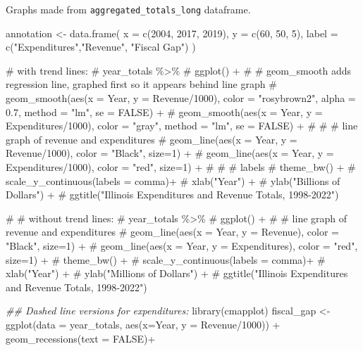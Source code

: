 \documentclass[
  letterpaper,
  DIV=11,
  numbers=noendperiod]{scrreport}
\newenvironment{Shaded}{\begin{snugshade}}{\end{snugshade}}
\newcommand{\AttributeTok}[1]{\textcolor[rgb]{0.40,0.45,0.13}{#1}}
\newcommand{\CommentTok}[1]{\textcolor[rgb]{0.37,0.37,0.37}{#1}}
\newcommand{\ConstantTok}[1]{\textcolor[rgb]{0.56,0.35,0.01}{#1}}
\newcommand{\DecValTok}[1]{\textcolor[rgb]{0.68,0.00,0.00}{#1}}
\newcommand{\DocumentationTok}[1]{\textcolor[rgb]{0.37,0.37,0.37}{\textit{#1}}}
\newcommand{\FunctionTok}[1]{\textcolor[rgb]{0.28,0.35,0.67}{#1}}
\newcommand{\NormalTok}[1]{\textcolor[rgb]{0.00,0.23,0.31}{#1}}
\newcommand{\OtherTok}[1]{\textcolor[rgb]{0.00,0.23,0.31}{#1}}
\newcommand{\SpecialCharTok}[1]{\textcolor[rgb]{0.37,0.37,0.37}{#1}}
\newcommand{\StringTok}[1]{\textcolor[rgb]{0.13,0.47,0.30}{#1}}
\begin{document}
Graphs made from \texttt{aggregated\_totals\_long} dataframe.

\begin{Shaded}
\begin{Highlighting}[]
\NormalTok{annotation }\OtherTok{\textless{}{-}} \FunctionTok{data.frame}\NormalTok{(}
  \AttributeTok{x =} \FunctionTok{c}\NormalTok{(}\DecValTok{2004}\NormalTok{, }\DecValTok{2017}\NormalTok{, }\DecValTok{2019}\NormalTok{),}
  \AttributeTok{y =} \FunctionTok{c}\NormalTok{(}\DecValTok{60}\NormalTok{, }\DecValTok{50}\NormalTok{, }\DecValTok{5}\NormalTok{),  }
  \AttributeTok{label =} \FunctionTok{c}\NormalTok{(}\StringTok{"Expenditures"}\NormalTok{,}\StringTok{"Revenue"}\NormalTok{, }\StringTok{"Fiscal Gap"}\NormalTok{)}
\NormalTok{)}

\CommentTok{\# with trend lines:}
\CommentTok{\# year\_totals \%\textgreater{}\%  }
\CommentTok{\#   ggplot() +}
\CommentTok{\#   \# geom\_smooth adds regression line, graphed first so it appears behind line graph}
\CommentTok{\#   geom\_smooth(aes(x = Year, y = Revenue/1000), color = "rosybrown2", alpha = 0.7, method = "lm", se = FALSE) + }
\CommentTok{\#   geom\_smooth(aes(x = Year, y = Expenditures/1000), color = "gray", method = "lm", se = FALSE) +}
\CommentTok{\#   }
\CommentTok{\#   \# line graph of revenue and expenditures}
\CommentTok{\#   geom\_line(aes(x = Year, y = Revenue/1000), color = "Black", size=1) +}
\CommentTok{\#   geom\_line(aes(x = Year, y = Expenditures/1000), color = "red", size=1) +}
\CommentTok{\#   }
\CommentTok{\#   \# labels}
\CommentTok{\#     theme\_bw() +}
\CommentTok{\#   scale\_y\_continuous(labels = comma)+}
\CommentTok{\#   xlab("Year") + }
\CommentTok{\#   ylab("Billions of Dollars")  +}
\CommentTok{\#   ggtitle("Illinois Expenditures and Revenue Totals, 1998{-}2022")}




\CommentTok{\# \# without trend lines:}
\CommentTok{\# year\_totals \%\textgreater{}\%  }
\CommentTok{\#   ggplot() +}
\CommentTok{\#   \# line graph of revenue and expenditures}
\CommentTok{\#   geom\_line(aes(x = Year, y = Revenue), color = "Black", size=1) +}
\CommentTok{\#   geom\_line(aes(x = Year, y = Expenditures), color = "red", size=1) +}
\CommentTok{\#       theme\_bw() +}
\CommentTok{\#   scale\_y\_continuous(labels = comma)+}
\CommentTok{\#   xlab("Year") + }
\CommentTok{\#   ylab("Millions of Dollars")  +}
\CommentTok{\#   ggtitle("Illinois Expenditures and Revenue Totals, 1998{-}2022")}


\DocumentationTok{\#\# Dashed line versions for expenditures: }
\FunctionTok{library}\NormalTok{(cmapplot)}
\NormalTok{fiscal\_gap }\OtherTok{\textless{}{-}}   
  \FunctionTok{ggplot}\NormalTok{(}\AttributeTok{data =}\NormalTok{ year\_totals, }\FunctionTok{aes}\NormalTok{(}\AttributeTok{x=}\NormalTok{Year, }\AttributeTok{y =}\NormalTok{ Revenue}\SpecialCharTok{/}\DecValTok{1000}\NormalTok{)) }\SpecialCharTok{+}
  \FunctionTok{geom\_recessions}\NormalTok{(}\AttributeTok{text =} \ConstantTok{FALSE}\NormalTok{)}\SpecialCharTok{+}


\end{Highlighting}
\end{Shaded}
\end{document}
